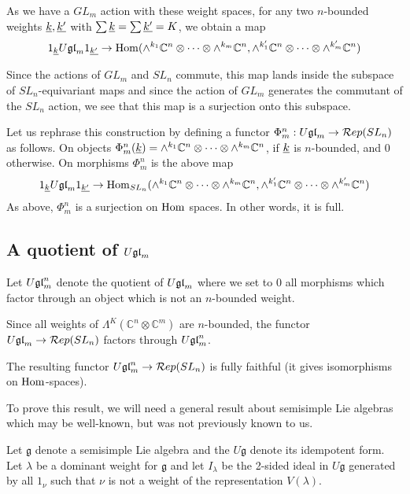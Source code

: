 \documentclass[11pt,leqno]{article}
\begin{document}
As we have a $ GL_m$ action with these weight spaces, for any two $n$-bounded weights $ {\underline{k}}, {\underline{k'}}$ with $ \sum {\underline{k}} = \sum {\underline{k'}} = K$, we obtain a map
$$
1_{\underline{k}} U\mathfrak{gl}_{m} 1_{\underline{k'}} \rightarrow \operatorname{Hom}(\wedge^{k_1} \mathbb C^n \otimes \cdots \otimes \wedge^{k_m} \mathbb C^n, \wedge^{k'_1} \mathbb C^n \otimes \cdots \otimes \wedge^{k'_m} \mathbb C^n)
$$

Since the actions of $GL_m $ and $ SL_n $ commute, this map lands inside the subspace of $ SL_n$-equivariant maps and since the action of $ GL_m$ generates the commutant of the $ SL_n $ action, we see that this map is a surjection onto this subspace.

Let us rephrase this construction by defining a functor $ \Phi_m^n : U\mathfrak{gl}_{m} \rightarrow \mathcal{R}ep(SL_{n}) $ as follows.  On objects $ \Phi_m^n({\underline{k}}) = \wedge^{k_1} \mathbb C^n \otimes \cdots \otimes \wedge^{k_m} \mathbb C^n $, if $ {\underline{k}} $ is $n$-bounded, and 0 otherwise.  On morphisms $ \Phi_m^n $ is the above map 
$$
1_{\underline{k}} U\mathfrak{gl}_{m} 1_{\underline{k'}} \rightarrow \operatorname{Hom}_{SL_n}(\wedge^{k_1} \mathbb C^n \otimes \cdots \otimes \wedge^{k_m} \mathbb C^n, \wedge^{k'_1} \mathbb C^n \otimes \cdots \otimes \wedge^{k'_m} \mathbb C^n)
$$
As above, $ \Phi_m^n $ is a surjection on $\operatorname{Hom}$ spaces.  In other words, it is full.

\subsection{A quotient of $U\mathfrak{gl}_{m}$}
Let $ U\mathfrak{gl}_{m}^n $ denote the quotient of $ U\mathfrak{gl}_{m} $ where we set to 0 all morphisms which factor through an object which is not an $n$-bounded weight.

Since all weights of $ \Lambda^K(\mathbb{C}^n \otimes \mathbb{C}^m) $ are $ n$-bounded, the functor $ U\mathfrak{gl}_{m} \rightarrow \mathcal{R}ep(SL_{n}) $ factors through $ U\mathfrak{gl}_{m}^n $.

\begin{thm} \label{th:functorfullyfaithful}
The resulting functor $ U\mathfrak{gl}_{m}^n \rightarrow \mathcal{R}ep(SL_{n})$ is fully faithful (it gives isomorphisms on $\operatorname{Hom}$-spaces).
\end{thm}

To prove this result, we will need a general result about semisimple Lie algebras which may be well-known, but was not previously known to us.

Let $ \mathfrak g $ denote a semisimple Lie algebra and the $ U \mathfrak g $ denote its idempotent form.  Let $ \lambda $ be a dominant weight for $ \mathfrak g $ and let $ I_\lambda $ be the 2-sided ideal in $ U\mathfrak g $ generated by all $ 1_\nu $ such that $ \nu $ is not a weight of the representation $ V(\lambda) $.
\end{document}
